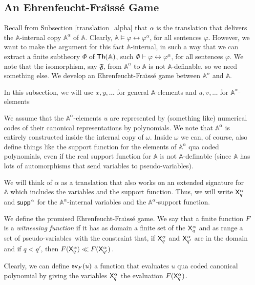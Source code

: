 \documentclass{amsart}
\renewcommand{\iff}{\leftrightarrow}
\renewcommand{\phi}{\varphi}
\renewcommand{\Phi}{\varPhi}
\newcommand{\mf}[1]{{\mathfrak {#1}}}
\newcommand{\X}{{\sf X}}
\newcommand{\psvar}{pseudo-variables}
\begin{document}
\subsection{An Ehrenfeucht-Fra\"{\i}ss\'{e} Game}\label{sect_pam_ehren}
Recall from Subsection \ref{translation_alpha} that $\alpha$ is the translation that delivers the $\mathbb{A}$-internal copy $\mathbb{A}^{\alpha}$ of $\mathbb{A}$. Clearly, $\mathbb A\models \phi \iff \phi^\alpha$, for all sentences $\phi$. 
However, we want to make 
 the argument for this fact $\mathbb A$-internal, in such a way that we can extract a finite subtheory $\Phi$ of
${\sf Th}(\mathbb A)$, such $\Phi \vdash \phi \iff \phi^\alpha$, for all sentences $\phi$. We note that
the isomorphism, say $\mf F$, from $\mathbb A^\alpha$ to $\mathbb A$ is not $\mathbb A$-definable,
so we need something else. We develop an Ehrenfeucht-Fra\"{\i}ss\'{e} game between $\mathbb A^\alpha$ and
$\mathbb A$.

In this subsection, we will use $x,y,\dots$ for general $\mathbb A$-elements and $u,v,\dots$ for
$\mathbb A^\alpha$-elements

We assume that the $\mathbb A^\alpha$-elements $u$ are represented by (something like)
numerical codes of their canonical representations by polynomials. 
We note that $\mathbb A^\alpha$ is entirely constructed inside the internal copy of $\omega$.
Inside $\omega$ we can, of course, also define things like the support function for 
the elements of $\mathbb A^\alpha$ qua coded polynomials, even if the real support function for
$\mathbb A$ is not $\mathbb A$-definable (since $\mathbb{A}$ has lots of automorphisms that send variables to pseudo-variables). 

We will think of $\alpha$ as a translation that also works
on an extended signature for $\mathbb A$ which includes the variables and the support function.
Thus, we will write $\X_q^\alpha$ and ${\sf supp}^\alpha$ for the $\mathbb A^\alpha$-internal variables
and the $\mathbb A^\alpha$-support function.

We define the promised Ehrenfeucht-Fra\"{\i}ss\'{e} game.
We say that a finite function $F$ is a \emph{witnessing function} if it has as domain a finite set of the $\X^\alpha_q$ and as range a
set of \psvar\ with the constraint that, if $\X^\alpha_q$ and $\X^\alpha_{q'}$ are in the domain and if $q<q'$, then
$F(\X^\alpha_q) \ll F(\X^\alpha_{q'})$.

Clearly, we can define ${\sf ev}_F(u)$ a function that evaluates $u$ qua coded
canonical polynomial by giving the variables $\X^\alpha_q$ the evaluation $F(\X^\alpha_q)$.
\end{document}
